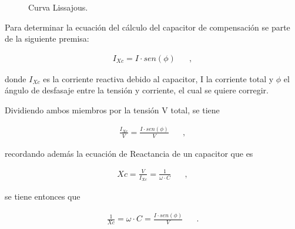         \begin{figure}[H]
          \centering
            \caption{Curva Lissajous.}
            \label{fig:Lissajous}
        \end{figure}

    Para determinar la ecuación del cálculo del capacitor de compensación se parte de la siguiente
    premisa:

    \begin{align*}
      I_{Xc} = I \cdot sen(\phi) \hspace{20pt},
    \end{align*}

    donde $I_{Xc}$ es la corriente reactiva debido al capacitor, I la corriente total y $\phi$ el 
    ángulo de desfasaje entre la tensión y corriente, el cual se quiere corregir.

    Dividiendo ambos miembros por la tensión V total, se tiene

    \begin{align*}
       \frac{I_{Xc}}{V} = \frac{I \cdot sen(\phi)}{V} \hspace{20pt},
    \end{align*}

    recordando además la ecuación de Reactancia de un capacitor que es

    \begin{align*}
        Xc = \frac{V}{I_{Xc}} = \frac{1}{\omega \cdot C} \hspace{20pt},   
    \end{align*}

    se tiene entonces que

    \begin{align*}
       \frac{1}{Xc} = \omega \cdot C = \frac{I \cdot sen(\phi)}{V} \hspace{20pt}.
    \end{align*}

